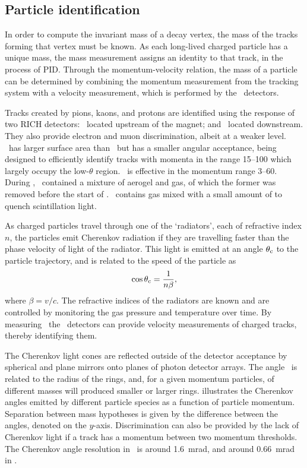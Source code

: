 \subsection{Particle identification}
\label{chap:intro:lhcb:detector:pid}

In order to compute the invariant mass of a decay vertex, the mass of the 
tracks forming that vertex must be known.
As each long-lived charged particle has a unique mass, the mass measurement 
assigns an identity to that track, in the process of \acf{PID}.
Through the momentum-velocity relation, the mass of a particle can be 
determined by combining the momentum measurement from the tracking system with 
a velocity measurement, which is performed by the \rich\ detectors.

Tracks created by pions, kaons, and protons are identified using the response 
of two \acl{RICH} detectors: \richone\ located upstream of the magnet; and 
\richtwo\ located downstream.
They also provide electron and muon discrimination, albeit at a weaker level.
\richtwo\ has larger surface area than \richone\ but has a smaller angular 
acceptance, being designed to efficiently identify tracks with momenta in the 
range \SIrange{15}{100}{\GeVc} which largely occupy the low-$\theta$ region.
\richone\ is effective in the momentum range \SIrange{3}{60}{\GeVc}.
During \runone, \richone\ contained a mixture of aerogel and  gas, of 
which the former was removed before the start of \runtwo.
\richtwo\ contains  gas mixed with a small amount of  to quench 
scintillation light.

As charged particles travel through one of the `radiators', each of refractive 
index $n$, the particles emit Cherenkov radiation if they are travelling faster 
than the phase velocity of light of the radiator.
This light is emitted at an angle $\theta_{\textnormal{c}}$ to the particle trajectory, and is 
related to the speed of the particle as
\begin{equation}
  \cos{\ensuremath{\theta_{\textnormal{c}}}} = \frac{1}{n\beta},
\end{equation}
where $\beta = v/c$.
The refractive indices of the radiators are known and are controlled by 
monitoring the gas pressure and temperature over time.
By measuring \thetac\ the \rich\ detectors can provide velocity measurements of 
charged tracks, thereby identifying them.

The Cherenkov light cones are reflected outside of the \lhcb detector 
acceptance by spherical and plane mirrors onto planes of photon detector 
arrays.
The angle \thetac\ is related to the radius of the rings, and, for a given 
momentum particles, of different masses will produced smaller or larger rings.
 illustrates the Cherenkov angles emitted 
by different particle species as a function of particle momentum.
Separation between mass hypotheses is given by the difference between the 
angles, denoted on the $y$-axis.
Discrimination can also be provided by the lack of Cherenkov light if a track 
has a momentum between two momentum thresholds.
The Cherenkov angle resolution in \richone\ is around \SI{1.6}{\milli\radian}, 
and around \SI{0.66}{\milli\radian} in \richtwo.

